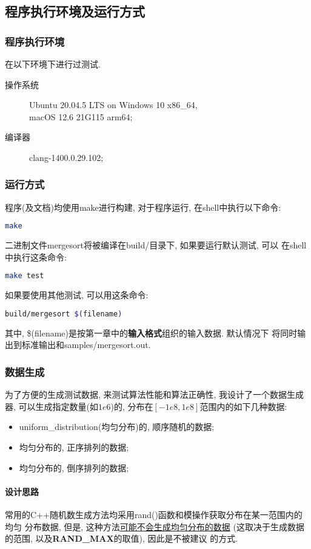 \subsection{程序执行环境及运行方式}
\subsubsection{程序执行环境}
在以下环境下进行过测试.
\begin{description}
	\item[操作系统] Ubuntu 20.04.5 LTS on Windows 10 x86\_64, \\
		macOS 12.6 21G115 arm64;
	\item[编译器] clang-1400.0.29.102;
\end{description}
\subsubsection{运行方式}
程序(及文档)均使用make进行构建, 对于程序运行, 在shell中执行以下命令:
\begin{lstlisting}[language=bash]
make
\end{lstlisting}
二进制文件mergesort将被编译在build/目录下, 如果要运行默认测试, 可以
在shell中执行这条命令:
\begin{lstlisting}[language=bash]
make test
\end{lstlisting}
如果要使用其他测试, 可以用这条命令:
\begin{lstlisting}[language=bash]
build/mergesort $(filename)
\end{lstlisting}
其中, \$(filename)是按第一章中的\textbf{输入格式}组织的输入数据. 默认情况下
将同时输出到标准输出和samples/mergesort.out.
\subsubsection{数据生成}
为了方便的生成测试数据, 来测试算法性能和算法正确性, 我设计了一个数据生成器,
可以生成指定数量(如$1e6$)的, 分布在$[-1e8, 1e8]$范围内的如下几种数据:
\begin{itemize}
  \item uniform\_distribution(均匀分布)的, 顺序随机的数据;
  \item 均匀分布的, 正序排列的数据;
  \item 均匀分布的, 倒序排列的数据;
\end{itemize}
\paragraph{设计思路}
常用的C++随机数生成方法均采用rand()函数和模操作获取分布在某一范围内的均匀
分布数据, 但是, 这种方法\href{https://stackoverflow.com/a/52869953}
{可能不会生成均匀分布的数据}
(这取决于生成数据的范围, 以及\textbf{RAND\_MAX}的取值), 因此是不被建议
的方式.\par

